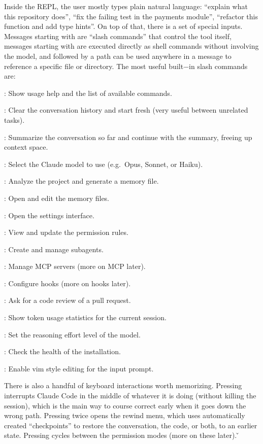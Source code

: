 Inside the REPL, the user mostly types plain natural language: ``explain what this repository does'', ``fix the
failing test in the payments module'', ``refactor this function and add type hints''. On top of that, there is a set
of special inputs. Messages starting with \code{/} are ``slash commands'' that control the tool itself, messages
starting with \code{!} are executed directly as shell commands without involving the model, and  followed by
a path can be used anywhere in a message to reference a specific file or directory. The most useful built$-$in slash
commands are:
\bit
\item {}: Show usage help and the list of available commands.
\item {}: Clear the conversation history and start fresh (very useful between unrelated tasks).
\item {}: Summarize the conversation so far and continue with the summary, freeing up context space.
\item {}: Select the Claude model to use (e.g.\ Opus, Sonnet, or Haiku).
\item {}: Analyze the project and generate a  memory file.
\item {}: Open and edit the memory files.
\item {}: Open the settings interface.
\item {}: View and update the permission rules.
\item {}: Create and manage subagents.
\item {}: Manage MCP servers (more on MCP later).
\item {}: Configure hooks (more on hooks later).
\item {}: Ask for a code review of a pull request.
\item {}: Show token usage statistics for the current session.
\item {}: Set the reasoning effort level of the model.
\item {}: Check the health of the installation.
\item {}: Enable vim style editing for the input prompt.
\eit

There is also a handful of keyboard interactions worth memorizing. Pressing  interrupts Claude Code in the
middle of whatever it is doing (without killing the session), which is the main way to course correct early when it
goes down the wrong path. Pressing  twice opens the rewind menu, which uses automatically created
``checkpoints'' to restore the conversation, the code, or both, to an earlier state. Pressing  cycles
between the permission modes (more on these later). \v

